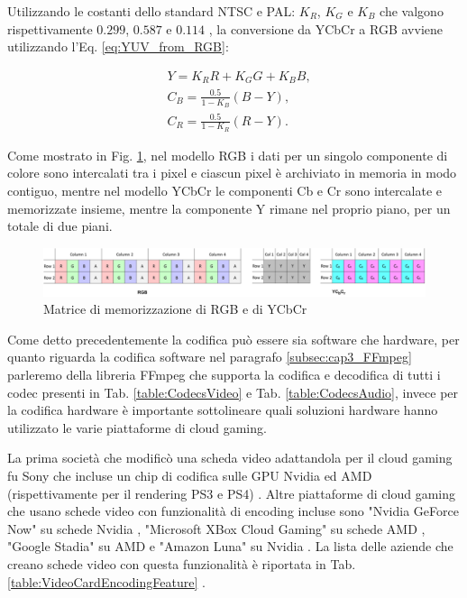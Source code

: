 Utilizzando le costanti dello standard NTSC e PAL: $K_R$, $K_G$ e $K_B$ che valgono rispettivamente $0.299$, $0.587$ e $0.114$ \parencite{VideoAndMultimediaTransmissionsOverCellularNetworks}, la conversione da YCbCr a RGB avviene utilizzando l'Eq. \ref{eq:YUV_from_RGB}:

\begin{equation} \label{eq:YUV_from_RGB}
	\begin{aligned}
		& Y = K_R R + K_G G + K_B B, \\	
		& C_B = \frac{0.5}{1 - K_B} (B - Y), \\
		& C_R = \frac{0.5}{1 - K_R} (R - Y).	
	\end{aligned}
\end{equation}

Come mostrato in Fig. \ref{fig:RGB_YCbCr_matrix}, nel modello RGB i dati per un singolo componente di colore sono intercalati tra i pixel e ciascun pixel è archiviato in memoria in modo contiguo, mentre nel modello YCbCr le componenti Cb e Cr sono intercalate e memorizzate insieme, mentre la componente Y rimane nel proprio piano, per un totale di due piani.

\begin{figure}[H]
	\includegraphics[width=\linewidth]{immagini/RGB_YCbCr_matrix}
	\caption{Matrice di memorizzazione di RGB e di YCbCr}
	\label{fig:RGB_YCbCr_matrix}
\end{figure}

Come detto precedentemente la codifica può essere sia software che hardware, per quanto riguarda la codifica software nel paragrafo \ref{subsec:cap3_FFmpeg} parleremo della libreria FFmpeg che supporta la codifica e decodifica di tutti i codec presenti in Tab. \ref{table:CodecsVideo} e Tab. \ref{table:CodecsAudio}, invece per la codifica hardware è importante sottolineare quali soluzioni hardware hanno utilizzato le varie piattaforme di cloud gaming.

La prima società che modificò una scheda video adattandola per il cloud gaming fu Sony che incluse un chip di codifica sulle GPU Nvidia ed AMD (rispettivamente per il rendering PS3 e PS4) \parencite{PlayStation_Now_Chip}. Altre piattaforme di cloud gaming che usano schede video con funzionalità di encoding incluse sono "Nvidia GeForce Now" su schede Nvidia \parencite{GeForce_Now}, "Microsoft XBox Cloud Gaming" su schede AMD \parencite{xCloudBlade}, "Google Stadia" su AMD \parencite{Google_Stadia_Server} e "Amazon Luna" su Nvidia \parencite{Amazon_Luna_GPU}. La lista delle aziende che creano schede video con questa funzionalità è riportata in Tab. \ref{table:VideoCardEncodingFeature} \parencite{GCNArchitecture} \parencite{IntelQuickSyncVideo} \parencite{NVIDIAVideoCodecSDK} \parencite{Hexagon_DSP_SDK}.

